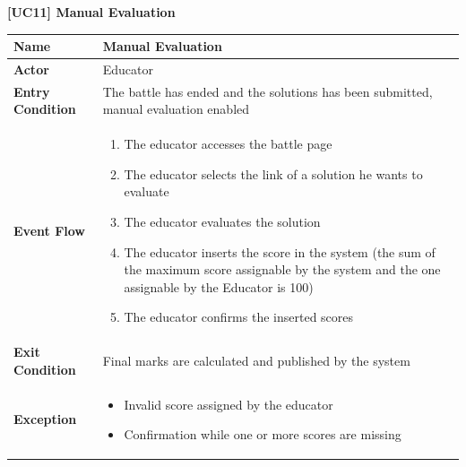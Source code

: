 \documentclass{article}
\begin{document}
\begin{table}
 \renewcommand{\arraystretch}{1.5}
    \centering
    \raggedright\textbf{[UC11] Manual Evaluation}
    \begin{tabular}{|l|p{10cm}|}
        \hline
        \textbf{Name} & Manual Evaluation \\
        \hline
        \textbf{Actor} & Educator \\
        \hline
        \textbf{Entry Condition} & The battle has ended and the solutions has been submitted, manual evaluation enabled\\
        \hline
        \textbf{Event Flow} & 
        \begin{enumerate}[align=left, topsep=0pt, partopsep=0pt]
            \item The educator accesses the battle page
            \item The educator selects the link of a solution he wants to evaluate
            \item The educator evaluates the solution 
            \item The educator inserts the score in the system (the sum of the maximum score assignable by the system and the one assignable by the Educator is 100)
            \item The educator confirms the inserted scores
        \end{enumerate} \\
        \hline
        \textbf{Exit Condition} & Final marks are calculated and published by the system  \\
        \hline
        \textbf{Exception} & 
        \begin{itemize}[topsep=0pt, partopsep=0pt]
            \item Invalid score assigned by the educator
            \item Confirmation while one or more scores are missing
        \end{itemize} \\
        \hline
    \end{tabular}
\end{table}
\end{document}
